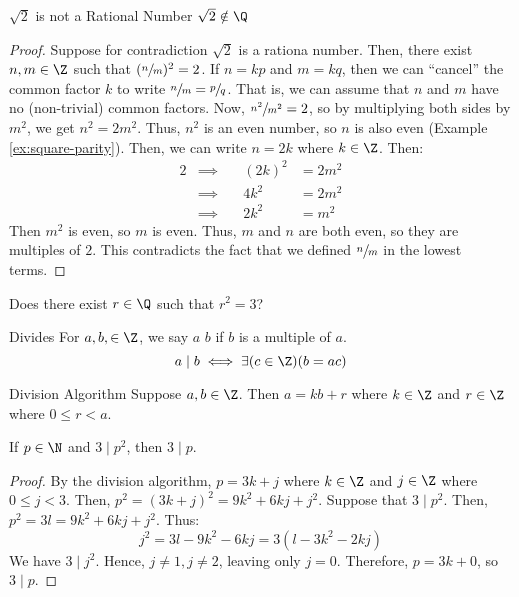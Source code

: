 \begin{thmbox}{$\sqrt{2}$ is not a Rational Number}{}
    $\sqrt{2} \notin \Q$
    \tcblower
    \begin{proof}
        Suppose for contradiction $\sqrt{2}$ is a rationa number. Then, there exist $n,m \in \Z$ such that $(\sfrac{n}{m})^2 = 2$. If $n = kp$ and $m = kq$, then we can ``cancel'' the common factor $k$ to write $\sfrac{n}{m} = \sfrac{p}{q}$. That is, we can assume that $n$ and $m$ have no (non-trivial) common factors. Now, $\sfrac{n^2}{m^2} = 2$, so by multiplying both sides by $m^2$, we get $n^2 = 2m^2$. Thus, $n^2$ is an even number, so $n$ is also even (Example \ref{ex:square-parity}). Then, we can write $n = 2k$ where $k \in \Z$. Then:
            \begin{alignat*}{2}
                & \implies \quad & (2k)^2 &= 2m^2 \\
                & \implies \quad & 4k^2 &= 2m^2 \\
                & \implies \quad & 2k^2 &= m^2
            \end{alignat*}
            Then $m^2$ is even, so $m$ is even. Thus, $m$ and $n$ are both even, so they are multiples of $2$. This contradicts the fact that we defined $\sfrac{n}{m}$ in the lowest terms.
    \end{proof}
\end{thmbox}

Does there exist $r \in \Q$ such that $r^2 = 3$?

\begin{dfnbox}{Divides}{}
    For $a,b, \in \Z$, we say $a$  $b$ if $b$ is a multiple of $a$.
    \tcblower
    \[ a \mid b \iff \exists(c \in \Z)(b=ac) \]
\end{dfnbox}

\begin{thmbox}{Division Algorithm}{}
    Suppose $a,b \in \Z$. Then $a = kb + r$ where $k \in \Z$ and $r \in \Z$ where $0 \leq r < a$.
\end{thmbox}

\begin{exbox}{}{}
    If $p \in \N$ and $3 \mid p^2$, then $3 \mid p$.
    \tcblower
    \begin{proof}
        By the division algorithm, $p = 3k+j$ where $k \in \Z$ and $j \in \Z$ where $0 \leq j < 3$. Then, $p^2 = (3k+j)^2 = 9k^2 + 6kj + j^2$. Suppose that $3 \mid p^2$. Then, $p^2 = 3l = 9k^2 + 6kj + j^2$. Thus:
        \[ j^2 = 3l-9k^2-6kj = 3(l-3k^2-2kj) \]
        We have $3 \mid j^2$. Hence, $j \neq 1, j \neq 2$, leaving only $j = 0$. Therefore, $p = 3k + 0$, so $3 \mid p$.
    \end{proof}
\end{exbox}

